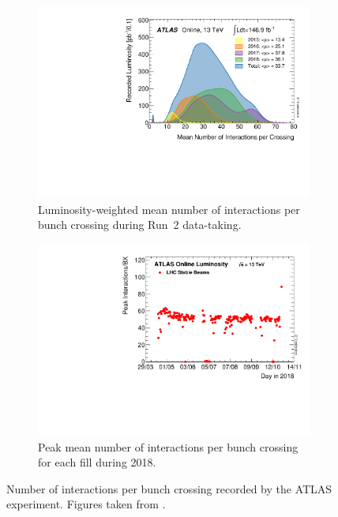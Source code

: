 \begin{figure}
	\centering
	\begin{subfigure}[b]{0.495\linewidth}
		\centering\includegraphics[width=\textwidth]{mu_2015_2018}
		\caption{Luminosity-weighted mean number of interactions per bunch crossing during Run~2 data-taking.\label{fig:mu_2015_2018}}
	\end{subfigure}\hfill
	\begin{subfigure}[b]{0.495\linewidth}
		\centering\includegraphics[width=\textwidth]{peakMuByFill}
		\caption{Peak mean number of interactions per bunch crossing for each fill during 2018.\label{fig:peakMuByFill}}
	\end{subfigure}%
	\caption{Number of interactions per bunch crossing recorded by the ATLAS experiment. Figures taken from \cite{ATLAS:Run2}.}\label{fig:mu_run2}
\end{figure}

